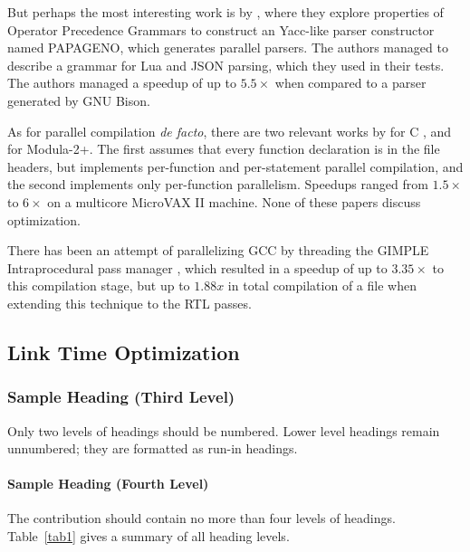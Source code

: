\documentclass[runningheads]{llncs}
\begin{document}
But perhaps the most interesting work is by
\cite{Barenghi:2015:PPM:2839536.2840146}, where they explore properties of
Operator Precedence Grammars to construct an Yacc-like parser constructor named
PAPAGENO, which generates parallel parsers. The authors managed to describe a
grammar for Lua and JSON parsing, which they used in their tests. The authors
managed a speedup of up to $5.5\times$ when compared to a parser generated by
GNU Bison.

As for parallel compilation \textit{de facto}, there are two relevant works by
\cite{vandevoorde1988parallel} for C , and \cite{wortman1992} for Modula-2+.
The first assumes that every function declaration is in the file headers, but
implements per-function and per-statement parallel compilation, and the second
implements only per-function parallelism.  Speedups ranged from $1.5\times$ to
$6\times$ on a multicore MicroVAX II machine. None of these papers discuss
optimization.

There has been an attempt of parallelizing GCC by threading the GIMPLE
Intraprocedural pass manager \cite{bernardino2020improving}, which resulted in
a speedup of up to $3.35\times$ to this compilation stage, but up to $1.88x$ in
total compilation of a file when extending this technique to the RTL passes.


\subsection{Link Time Optimization}



\subsubsection{Sample Heading (Third Level)} Only two levels of
headings should be numbered. Lower level headings remain unnumbered;
they are formatted as run-in headings.

\paragraph{Sample Heading (Fourth Level)}
The contribution should contain no more than four levels of
headings. Table~\ref{tab1} gives a summary of all heading levels.
\end{document}
